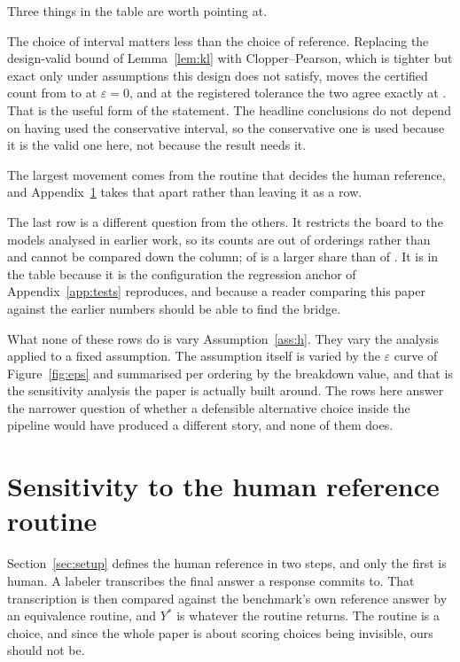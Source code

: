 

Three things in the table are worth pointing at.

The choice of interval matters less than the choice of reference. Replacing the design-valid
bound of Lemma~\ref{lem:kl} with Clopper--Pearson, which is tighter but exact only under
assumptions this design does not satisfy, moves the certified count from \CertEpsZero{} to
\SensCpCombined{} at $\varepsilon = 0$, and at the registered tolerance the two agree exactly
at \CertPrereg{}. That is the useful form of the statement. The headline conclusions do not
depend on having used the conservative interval, so the conservative one is used because it is
the valid one here, not because the result needs it.

The largest movement comes from the routine that decides the human reference, and
Appendix~\ref{sec:sensitivity} takes that apart rather than leaving it as a row.

The last row is a different question from the others. It restricts the board to the models
analysed in earlier work, so its counts are out of \NumOrderingsSeventeen{} orderings rather
than \NumOrderings{} and cannot be compared down the column;
\SensSeventeenCombined{} of \NumOrderingsSeventeen{} is a larger share than \CertEpsZero{} of
\NumOrderings{}. It is in the table because it is the configuration the regression anchor of
Appendix~\ref{app:tests} reproduces, and because a reader comparing this paper against the
earlier numbers should be able to find the bridge.

What none of these rows do is vary Assumption~\ref{ass:h}. They vary the analysis applied to
a fixed assumption. The assumption itself is varied by the $\varepsilon$ curve of
Figure~\ref{fig:eps} and summarised per ordering by the breakdown value, and that is the
sensitivity analysis the paper is actually built around. The rows here answer the narrower
question of whether a defensible alternative choice inside the pipeline would have produced a
different story, and none of them does.

\section{Sensitivity to the human reference routine}
\label{sec:sensitivity}

Section~\ref{sec:setup} defines the human reference in two steps, and only the first is
human. A labeler transcribes the final answer a response commits to. That transcription is
then compared against the benchmark's own reference answer by an equivalence routine, and
$Y^*$ is whatever the routine returns. The routine is a choice, and since the whole paper is
about scoring choices being invisible, ours should not be.

